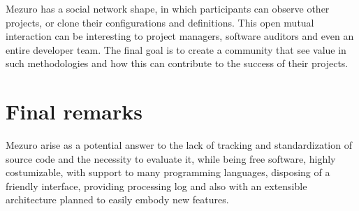 \documentclass{llncs}
\begin{document}

Mezuro has a social network shape, in which participants can observe other
projects, or clone their configurations and definitions. This open mutual
interaction can be interesting to project managers, software
auditors and even an entire developer team. The final goal is to create a
community that see value in such methodologies and how this can contribute
to the success of their projects.

\section{Final remarks}

Mezuro arise as a potential answer to the lack of tracking and standardization
of source code and the necessity to evaluate it, while being free software,
highly costumizable, with support to many programming languages, disposing of
a friendly interface, providing processing log and also with an extensible
architecture planned to easily embody new features.




\end{document}
